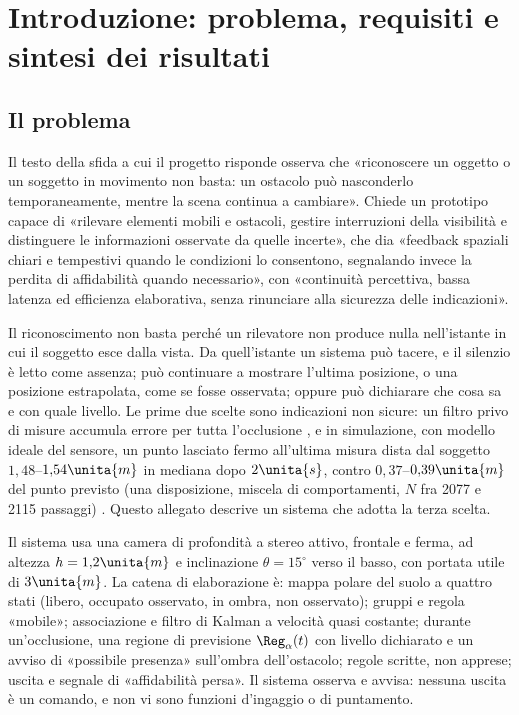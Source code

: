 \section{Introduzione: problema, requisiti e sintesi dei risultati}\label{sec:intro}

\subsection{Il problema}\label{sec:intro-problema}

Il testo della sfida a cui il progetto risponde osserva che «riconoscere un oggetto o un soggetto in movimento non basta: un ostacolo può nasconderlo temporaneamente, mentre la scena continua a cambiare». Chiede un prototipo capace di «rilevare elementi mobili e ostacoli, gestire interruzioni della visibilità e distinguere le informazioni osservate da quelle incerte», che dia «feedback spaziali chiari e tempestivi quando le condizioni lo consentono, segnalando invece la perdita di affidabilità quando necessario», con «continuità percettiva, bassa latenza ed efficienza elaborativa, senza rinunciare alla sicurezza delle indicazioni».

Il riconoscimento non basta perché un rilevatore non produce nulla nell'istante in cui il soggetto esce dalla vista. Da quell'istante un sistema può tacere, e il silenzio è letto come assenza; può continuare a mostrare l'ultima posizione, o una posizione estrapolata, come se fosse osservata; oppure può dichiarare che cosa sa e con quale livello. Le prime due scelte sono indicazioni non sicure: un filtro privo di misure accumula errore per tutta l'occlusione \cite{cao2023}, e in simulazione, con modello ideale del sensore, un punto lasciato fermo all'ultima misura dista dal soggetto $1{,}48$--$1{,}54\unita{m}$ in mediana dopo $2\unita{s}$, contro $0{,}37$--$0{,}39\unita{m}$ del punto previsto (una disposizione, miscela di comportamenti, $N$ fra 2077 e 2115 passaggi) . Questo allegato descrive un sistema che adotta la terza scelta.

Il sistema usa una camera di profondità a stereo attivo, frontale e ferma, ad altezza $h=1{,}2\unita{m}$ e inclinazione $\theta=15^\circ$ verso il basso, con portata utile di $3\unita{m}$. La catena di elaborazione è: mappa polare del suolo a quattro stati (libero, occupato osservato, in ombra, non osservato); gruppi e regola «mobile»; associazione e filtro di Kalman \cite{kalman1960} a velocità quasi costante; durante un'occlusione, una regione di previsione $\Reg_\alpha(t)$ con livello dichiarato e un avviso di «possibile presenza» sull'ombra dell'ostacolo; regole scritte, non apprese; uscita e segnale di «affidabilità persa». Il sistema osserva e avvisa: nessuna uscita è un comando, e non vi sono funzioni d'ingaggio o di puntamento.


